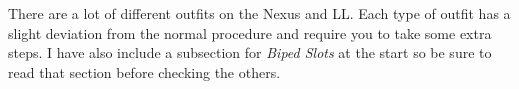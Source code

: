 There are a lot of different outfits on the Nexus and LL. Each type of outfit has a slight deviation from the normal procedure 
and require you to take some extra steps. I have also include a subsection for \textit{Biped Slots} at the start so be sure to read 
that section before checking the others.